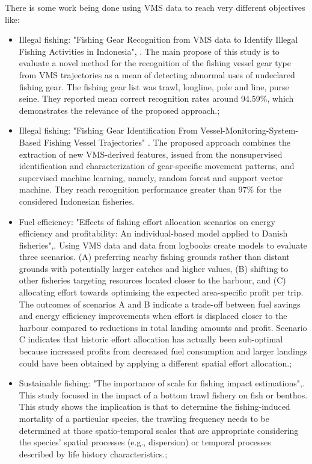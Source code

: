 There is some work being done using VMS data to reach very different objectives like:
\begin{itemize}
\item Illegal fishing: "Fishing Gear Recognition from VMS data to Identify Illegal Fishing Activities in Indonesia", \cite{MarzukiIllegalFishing}. The main propose of this study is to evaluate a novel method for the recognition of the fishing vessel gear type from VMS trajectories as a mean of detecting abnormal uses of undeclared fishing gear. The fishing gear list was trawl, longline, pole and line, purse seine. They reported mean correct recognition rates around 94.59\%, which demonstrates the relevance of the proposed approach.;
\item Illegal fishing: "Fishing Gear Identification From Vessel-Monitoring-System-Based Fishing Vessel Trajectories" \cite{FishingGearIdentification}. The proposed approach combines the extraction of new VMS-derived features, issued from the nonsupervised identification and characterization of gear-specific movement patterns, and supervised machine learning, namely, random forest and support vector machine. They reach recognition performance greater
than 97\% for the considered Indonesian fisheries.

\item Fuel efficiency: "Effects of fishing effort allocation scenarios on energy efficiency and profitability: An individual-based model applied to Danish fisheries",\cite{BastardieFishingEfficiency}. Using VMS data and data from logbooks create models to evaluate three scenarios. (A) preferring nearby fishing grounds rather than distant grounds with potentially larger catches and higher values, (B) shifting to other fisheries targeting resources located closer to the harbour, and (C) allocating effort towards optimising the expected area-specific profit per trip.  The outcomes of scenarios A and B indicate a trade-off between fuel savings and energy efficiency improvements when effort is displaced closer to the harbour compared to reductions in total landing amounts and profit. Scenario C indicates that historic effort allocation has actually been sub-optimal because increased profits from decreased fuel consumption and larger landings could have been obtained by applying a different spatial effort allocation.;
\item Sustainable fishing: "The importance of scale for fishing impact estimations",\cite{QuirijnsImportanceImpact}. This study focused in the impact of a bottom trawl fishery on fish or benthos. This study shows the implication is that to determine the fishing-induced mortality of a particular species, the trawling frequency needs to be determined at those spatio-temporal scales that are appropriate considering the species’ spatial processes (e.g., dispersion) or temporal processes described by life history characteristics.;
\end{itemize}

